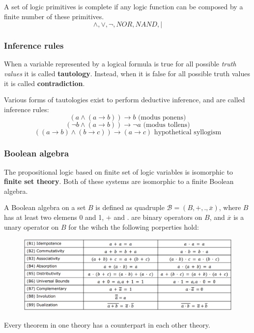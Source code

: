\documentclass{article}
\begin{document}
A set of logic primitives is complete if any logic function can be composed by a finite number of these
primitives.
$$\land,\lor,\lnot,NOR,NAND,|$$

\subsubsection{Inference rules}
When a variable represented by a logical formula is true for all possible \textit{truth values}
it is called \textbf{tautology}. Instead, when it is false for all possible truth values it is
called \textbf{contradiction}.

Various forms of tautologies exist to perform deductive inference, and are called inference rules:
$$(a\land (a\rightarrow b))\rightarrow b\text{ (modus ponens)}$$
$$(\lnot b \land (a\rightarrow b))\rightarrow \lnot a\text{ (modus tollens)}$$
$$((a\rightarrow b)\land (b\rightarrow c))\rightarrow (a\rightarrow c)\text{ hypothetical syllogism}$$

\subsubsection{Boolean algebra}
The propositional logic based on finite set of logic variables is isomorphic to \textbf{finite
    set theory}. Both of these systems are isomorphic to a finite Boolean algebra.

A Boolean algebra on a set $B$ is defined as quadruple $\mathcal{B}=(B,+,.,\overline{x})$, where
$B$ has at least two elemens 0 and 1, $+$ and $.$ are binary operators on $B$, and $\overline{x}$
is a unary operator on $B$ for the wihch the following porperties hold:

\begin{figure}[H]
    \centering
    \includegraphics[scale=0.35]{images/bool-prop.png}
\end{figure}

Every theorem in one theory has a counterpart in each other theory.
\end{document}
